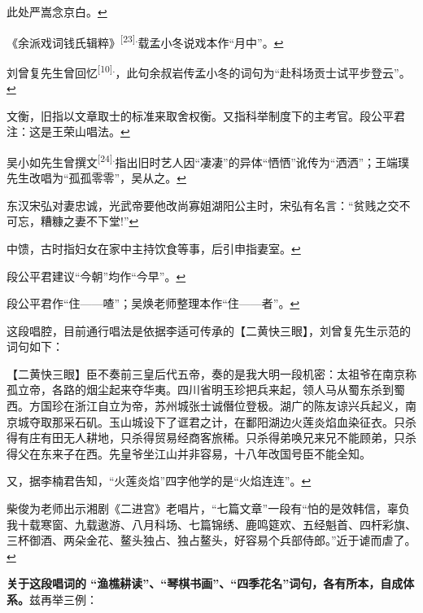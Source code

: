 \item
  \leavevmode\hypertarget{fn596}{}%
  此处严嵩念京白。\protect\hyperlink{fnref596}{↩}
\item
  \leavevmode\hypertarget{fn597}{}%
  《余派戏词钱氏辑粹》\textsuperscript{{[}23{]}.}载孟小冬说戏本作``月中''。\protect\hyperlink{fnref597}{↩}
\item
  \leavevmode\hypertarget{fn598}{}%
  刘曾复先生曾回忆\textsuperscript{{[}10{]}.}，此句余叔岩传孟小冬的词句为``赴科场贡士试平步登云''。\protect\hyperlink{fnref598}{↩}
\item
  \leavevmode\hypertarget{fn599}{}%
  文衡，旧指以文章取士的标准来取舍权衡。又指科举制度下的主考官。段公平君注：这是王荣山唱法。\protect\hyperlink{fnref599}{↩}
\item
  \leavevmode\hypertarget{fn600}{}%
  吴小如先生曾撰文\textsuperscript{{[}24{]}.}指出旧时艺人因``凄凄''的异体``恓恓''讹传为``洒洒''；王端璞先生改唱为``孤孤零零''，吴从之。\protect\hyperlink{fnref600}{↩}
\item
  \leavevmode\hypertarget{fn601}{}%
  东汉宋弘对妻忠诚，光武帝要他改尚寡姐湖阳公主时，宋弘有名言：``贫贱之交不可忘，糟糠之妻不下堂!''\protect\hyperlink{fnref601}{↩}
\item
  \leavevmode\hypertarget{fn602}{}%
  中馈，古时指妇女在家中主持饮食等事，后引申指妻室。\protect\hyperlink{fnref602}{↩}
\item
  \leavevmode\hypertarget{fn603}{}%
  段公平君建议``今朝''均作``今早''。\protect\hyperlink{fnref603}{↩}
\item
  \leavevmode\hypertarget{fn604}{}%
  段公平君作``住------喳''；吴焕老师整理本作``住------者''。\protect\hyperlink{fnref604}{↩}
\item
  \leavevmode\hypertarget{fn605}{}%
  这段唱腔，目前通行唱法是依据李适可传承的【二黄快三眼】，刘曾复先生示范的词句如下：

  【二黄快三眼】臣不奏前三皇后代五帝，奏的是我大明一段机密：太祖爷在南京称孤立帝，各路的烟尘起来夺华夷。四川省明玉珍把兵来起，领人马从蜀东杀到蜀西。方国珍在浙江自立为帝，苏州城张士诚僭位登极。湖广的陈友谅兴兵起义，南京城夺取那采石矶。玉山城设下了诓君之计，在鄱阳湖边火莲炎焰血染征衣。只杀得有庄有田无人耕地，只杀得贸易经商客旅稀。只杀得弟唤兄来兄不能顾弟，只杀得父在东来子在西。先皇爷坐江山并非容易，十八年改国号臣不能全知。

  又，据李楠君告知，``火莲炎焰''四字他学的是``火焰连连''。\protect\hyperlink{fnref605}{↩}
\item
  \leavevmode\hypertarget{fn606}{}%
  柴俊为老师出示湘剧《二进宫》老唱片，``七篇文章''一段有``怕的是效韩信，辜负我十载寒窗、九载遨游、八月科场、七篇锦绣、鹿鸣筵欢、五经魁首、四杆彩旗、三杯御酒、两朵金花、鳌头独占、独占鳌头，好容易个兵部侍郎。''近于谑而虐了。\protect\hyperlink{fnref606}{↩}
\item
  \leavevmode\hypertarget{fn607}{}%
  \textbf{关于这段唱词的
  ``渔樵耕读''、``琴棋书画''、``四季花名''词句，各有所本，自成体系。}兹再举三例：

